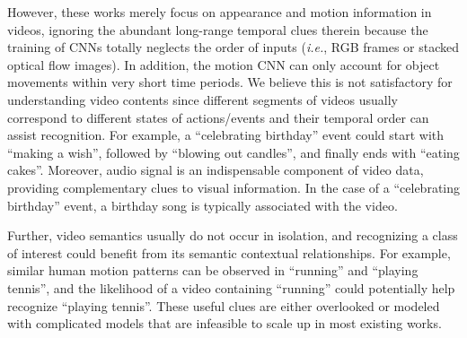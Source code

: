 \documentclass[journal]{IEEEtran}
\makeatletter
\newcommand*{\ie}{\emph{i.e.}\@\xspace}
\makeatother
\begin{document}
However, these works merely focus on appearance and motion information in videos, ignoring the abundant long-range temporal clues therein because the training of CNNs totally neglects the order of inputs (\ie, RGB frames or stacked optical flow images). In addition, the motion CNN can only account for object movements within very short time periods. We believe this is not satisfactory for understanding video contents since different segments of videos usually correspond to different states of actions/events and their temporal order can assist recognition. For example, a ``celebrating birthday'' event could start with ``making a wish'', followed by ``blowing out candles'', and finally ends with ``eating cakes''. Moreover, audio signal is an indispensable component of video data, providing complementary clues to visual information. In the case of a ``celebrating birthday'' event, a birthday song is typically associated with the video.

Further, video semantics usually do not occur in isolation, and recognizing a class of interest could benefit from its semantic contextual relationships. For example, similar human motion patterns can be observed  in ``running'' and ``playing tennis'', and the likelihood of a video containing ``running'' could potentially help recognize ``playing tennis''. These useful clues are either overlooked or modeled with complicated models that are infeasible to scale up in most existing works. 

\end{document}
